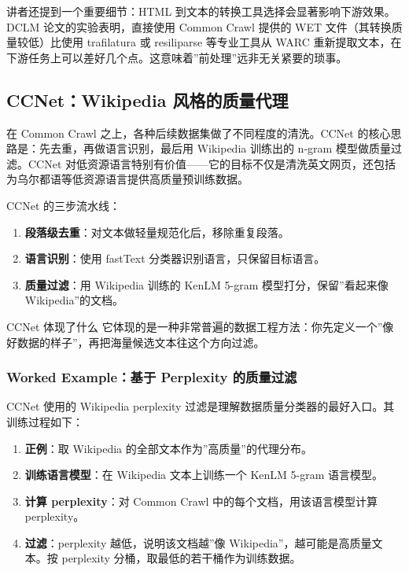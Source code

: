 \documentclass[a4paper]{article}
\begin{document}
讲者还提到一个重要细节：HTML 到文本的转换工具选择会显著影响下游效果。DCLM 论文的实验表明，直接使用 Common Crawl 提供的 WET 文件（其转换质量较低）比使用 trafilatura 或 resiliparse 等专业工具从 WARC 重新提取文本，在下游任务上可以差好几个点。这意味着”前处理”远非无关紧要的琐事。

\subsection{CCNet：Wikipedia 风格的质量代理}

在 Common Crawl 之上，各种后续数据集做了不同程度的清洗。CCNet 的核心思路是：先去重，再做语言识别，最后用 Wikipedia 训练出的 n-gram 模型做质量过滤。CCNet 对低资源语言特别有价值——它的目标不仅是清洗英文网页，还包括为乌尔都语等低资源语言提供高质量预训练数据。

CCNet 的三步流水线：
\begin{enumerate}
    \item \textbf{段落级去重}：对文本做轻量规范化后，移除重复段落。
    \item \textbf{语言识别}：使用 fastText 分类器识别语言，只保留目标语言。
    \item \textbf{质量过滤}：用 Wikipedia 训练的 KenLM 5-gram 模型打分，保留”看起来像 Wikipedia”的文档。
\end{enumerate}

\begin{importantbox}{CCNet 体现了什么}
它体现的是一种非常普遍的数据工程方法：你先定义一个”像好数据的样子”，再把海量候选文本往这个方向过滤。
\end{importantbox}

\subsubsection{Worked Example：基于 Perplexity 的质量过滤}

CCNet 使用的 Wikipedia perplexity 过滤是理解数据质量分类器的最好入口。其训练过程如下：

\begin{enumerate}
    \item \textbf{正例}：取 Wikipedia 的全部文本作为”高质量”的代理分布。
    \item \textbf{训练语言模型}：在 Wikipedia 文本上训练一个 KenLM 5-gram 语言模型。
    \item \textbf{计算 perplexity}：对 Common Crawl 中的每个文档，用该语言模型计算 perplexity。
    \item \textbf{过滤}：perplexity 越低，说明该文档越”像 Wikipedia”，越可能是高质量文本。按 perplexity 分桶，取最低的若干桶作为训练数据。
\end{enumerate}
\end{document}
